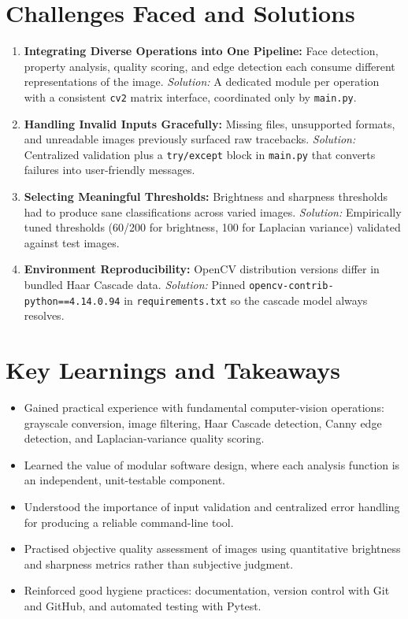 \documentclass[11pt,a4paper]{article}
\begin{document}
\section{Challenges Faced and Solutions}
\begin{enumerate}[leftmargin=1.5em, nosep]
    \item \textbf{Integrating Diverse Operations into One Pipeline:} Face detection, property analysis, quality scoring, and edge detection each consume different representations of the image. \textit{Solution:} A dedicated module per operation with a consistent \texttt{cv2} matrix interface, coordinated only by \texttt{main.py}.
    \item \textbf{Handling Invalid Inputs Gracefully:} Missing files, unsupported formats, and unreadable images previously surfaced raw tracebacks. \textit{Solution:} Centralized validation plus a \texttt{try/except} block in \texttt{main.py} that converts failures into user-friendly messages.
    \item \textbf{Selecting Meaningful Thresholds:} Brightness and sharpness thresholds had to produce sane classifications across varied images. \textit{Solution:} Empirically tuned thresholds (60/200 for brightness, 100 for Laplacian variance) validated against test images.
    \item \textbf{Environment Reproducibility:} OpenCV distribution versions differ in bundled Haar Cascade data. \textit{Solution:} Pinned \texttt{opencv-contrib-python==4.14.0.94} in \texttt{requirements.txt} so the cascade model always resolves.
\end{enumerate}

\section{Key Learnings and Takeaways}
\begin{itemize}[leftmargin=1.5em, nosep]
    \item Gained practical experience with fundamental computer-vision operations: grayscale conversion, image filtering, Haar Cascade detection, Canny edge detection, and Laplacian-variance quality scoring.
    \item Learned the value of modular software design, where each analysis function is an independent, unit-testable component.
    \item Understood the importance of input validation and centralized error handling for producing a reliable command-line tool.
    \item Practised objective quality assessment of images using quantitative brightness and sharpness metrics rather than subjective judgment.
    \item Reinforced good hygiene practices: documentation, version control with Git and GitHub, and automated testing with Pytest.
\end{itemize}
\end{document}
